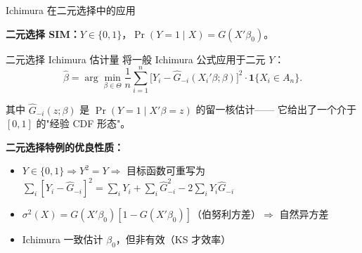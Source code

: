 \documentclass[aspectratio=169, 10pt]{beamer}
\begin{document}
\begin{frame}{Ichimura 在二元选择中的应用}

  \textbf{二元选择 SIM：}$Y \in \{0, 1\}$，$\Pr(Y=1 \mid X) = G(X'\beta_0)$。

  \begin{definitionbox}{{二元选择 Ichimura 估计量}}
    将一般 Ichimura 公式应用于二元 $Y$：
    $$\hat\beta = \arg\min_{\beta \in \Theta} \frac{1}{n}\sum_{i=1}^n
    \bigl[Y_i - \hat G_{-i}(X_i'\beta; \beta)\bigr]^2 \cdot \mathbf{1}\{X_i \in A_n\}.$$

    其中 $\hat G_{-i}(z; \beta)$ 是 $\Pr(Y=1 \mid X'\beta = z)$ 的留一核估计——
    它给出了一个介于 $[0,1]$ 的"经验 CDF 形态"。
  \end{definitionbox}

  \begin{highlightbox}
    \textbf{二元选择特例的优良性质：}
    \begin{itemize}\setlength{\itemsep}{1pt}
      \item $Y \in \{0,1\} \Rightarrow Y^2 = Y \Rightarrow$ 目标函数可重写为
      $\sum_i [Y_i - \hat G_{-i}]^2 = \sum_i Y_i + \sum_i \hat G_{-i}^2 - 2\sum_i Y_i \hat G_{-i}$
      \item $\sigma^2(X) = G(X'\beta_0)[1 - G(X'\beta_0)]$（伯努利方差）$\Rightarrow$
      自然异方差
      \item Ichimura 一致估计 $\beta_0$，但非有效（KS 才效率）
    \end{itemize}
  \end{highlightbox}

\end{frame}
\end{document}

